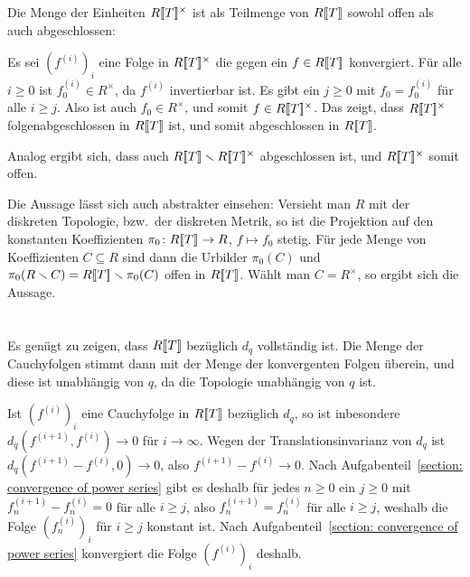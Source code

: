 \documentclass[a4paper, 10pt, numbers=noenddot]{scrartcl}
\begin{document}
\begin{remark}
  Die Menge der Einheiten $R[\![T]\!]^\times$ ist als Teilmenge von $R[\![T]\!]$ sowohl offen als auch abgeschlossen:
  
  Es sei $(f^{(i)})_i$ eine Folge in $R[\![T]\!]^\times$ die gegen ein $f \in R[\![T]\!]$ konvergiert.
  Für alle $i \geq 0$ ist $f^{(i)}_0 \in R^\times$, da $f^{(i)}$ invertierbar ist.
  Es gibt ein $j \geq 0$ mit $f_0 = f^{(i)}_0$ für alle $i \geq j$.
  Also ist auch $f_0 \in R^\times$, und somit $f \in R[\![T]\!]^\times$.
  Das zeigt, dass $R[\![T]\!]^\times$ folgenabgeschlossen in $R[\![T]\!]$ ist, und somit abgeschlossen in $R[\![T]\!]$.
  
  Analog ergibt sich, dass auch $R[\![T]\!] \smallsetminus R[\![T]\!]^\times$ abgeschlossen ist, und $R[\![T]\!]^\times$ somit offen.
  
  Die Aussage lässt sich auch abstrakter einsehen:
  Versieht man $R$ mit der diskreten Topologie, bzw.\ der diskreten Metrik, so ist die Projektion auf den konstanten Koeffizienten $\pi_0 \colon R[\![T]\!] \to R$, $f \mapsto f_0$ stetig.
  Für jede Menge von Koeffizienten $C \subseteq R$ sind dann die Urbilder $\pi_0(C)$ und $\pi_0(R \smallsetminus C) = R[\![T]\!] \smallsetminus \pi_0(C)$ offen in $R[\![T]\!]$.
  Wählt man $C = R^\times$, so ergibt sich die Aussage.
\end{remark}





\section{}

Es genügt zu zeigen, dass $R[\![T]\!]$ bezüglich $d_q$ vollständig ist.
Die Menge der Cauchyfolgen stimmt dann mit der Menge der konvergenten Folgen überein, und diese ist unabhängig von $q$, da die Topologie unabhängig von $q$ ist.

Ist $(f^{(i)})_i$ eine Cauchyfolge in $R[\![T]\!]$ bezüglich $d_q$, so ist inbesondere $d_q(f^{(i+1)}, f^{(i)}) \to 0$ für $i \to \infty$.
Wegen der Translationsinvarianz von $d_q$ ist $d_q(f^{(i+1)} - f^{(i)}, 0) \to 0$, also $f^{(i+1)} - f^{(i)} \to 0$.
Nach Aufgabenteil~\ref{section: convergence of power series} gibt es deshalb für jedes $n \geq 0$ ein $j \geq 0$ mit $f^{(i+1)}_n - f^{(i)}_n = 0$ für alle $i \geq j$, also $f^{(i+1)}_n = f^{(i)}_n$ für alle $i \geq j$, weshalb die Folge $(f^{(i)}_n)_i$ für $i \geq j$ konstant ist.
Nach Aufgabenteil~\ref{section: convergence of power series} konvergiert die Folge $(f^{(i)})_i$ deshalb.
\end{document}
